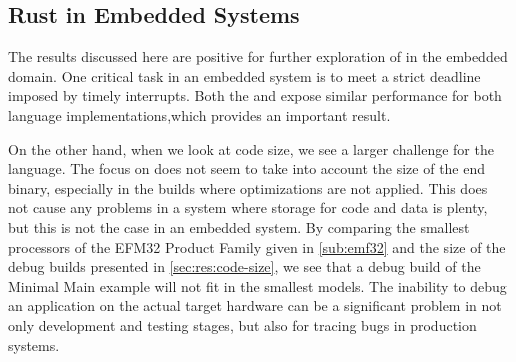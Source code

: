 \subsection{Rust in Embedded Systems}

The results discussed here are positive for further exploration of {\rust} in the embedded domain.
One critical task in an embedded system is to meet a strict deadline imposed by timely interrupts.
Both the {\tracker} and {\cg} expose similar performance for both language implementations,which provides an important result.

On the other hand, when we look at code size, we see a larger challenge for the {\rust} language.
The focus on  does not seem to take into account the size of the end binary, especially in the builds where optimizations are not applied.
This does not cause any problems in a system where storage for code and data is plenty, but this is not the case in an embedded system.
By comparing the smallest processors of the EFM32 Product Family given in \autoref{sub:emf32} and the size of the debug builds presented in \autoref{sec:res:code-size}, we see that a debug build of the Minimal Main example will not fit in the smallest models.
The inability to debug an application on the actual target hardware can be a significant problem in not only development and testing stages, but also for tracing bugs in production systems.
